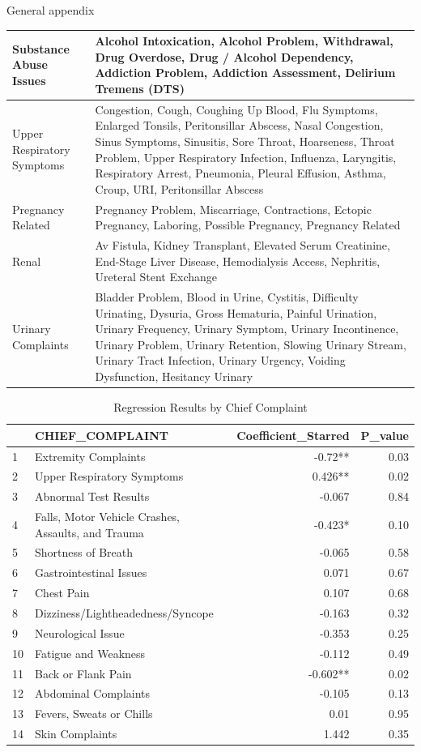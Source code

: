 \documentclass[,,nonblindrev]{informs}
\begin{document}
\begin{APPENDIX}{General appendix}
\begin{longtable}{|p{5cm}|p{12cm}|}
\hline
Substance Abuse Issues & Alcohol Intoxication, Alcohol Problem, Withdrawal, Drug Overdose, Drug / Alcohol Dependency, Addiction Problem, Addiction Assessment, Delirium Tremens (DTS) \\
\hline
Upper Respiratory Symptoms & Congestion, Cough, Coughing Up Blood, Flu Symptoms, Enlarged Tonsils, Peritonsillar Abscess, Nasal Congestion, Sinus Symptoms, Sinusitis, Sore Throat, Hoarseness, Throat Problem, Upper Respiratory Infection, Influenza, Laryngitis, Respiratory Arrest, Pneumonia, Pleural Effusion, Asthma, Croup, URI, Peritonsillar Abscess \\
\hline
Pregnancy Related & Pregnancy Problem, Miscarriage, Contractions, Ectopic Pregnancy, Laboring, Possible Pregnancy, Pregnancy Related \\
\hline
Renal & Av Fistula, Kidney Transplant, Elevated Serum Creatinine, End-Stage Liver Disease, Hemodialysis Access, Nephritis, Ureteral Stent Exchange \\
\hline
Urinary Complaints & Bladder Problem, Blood in Urine, Cystitis, Difficulty Urinating, Dysuria, Gross Hematuria, Painful Urination, Urinary Frequency, Urinary Symptom, Urinary Incontinence, Urinary Problem, Urinary Retention, Slowing Urinary Stream, Urinary Tract Infection, Urinary Urgency, Voiding Dysfunction, Hesitancy Urinary \\
\hline
\end{longtable}

\begin{table}[ht]
\centering
\caption{Regression Results by Chief Complaint} 
\begin{tabular}{llrr}
  \hline
 & CHIEF\_COMPLAINT & Coefficient\_Starred & P\_value \\ 
  \hline
1 & Extremity Complaints & -0.72** & 0.03 \\ 
  2 & Upper Respiratory Symptoms & 0.426** & 0.02 \\ 
  3 & Abnormal Test Results & -0.067 & 0.84 \\ 
  4 & Falls, Motor Vehicle Crashes, Assaults, and Trauma & -0.423* & 0.10 \\ 
  5 & Shortness of Breath & -0.065 & 0.58 \\ 
  6 & Gastrointestinal Issues & 0.071 & 0.67 \\ 
  7 & Chest Pain & 0.107 & 0.68 \\ 
  8 & Dizziness/Lightheadedness/Syncope & -0.163 & 0.32 \\ 
  9 & Neurological Issue & -0.353 & 0.25 \\ 
  10 & Fatigue and Weakness & -0.112 & 0.49 \\ 
  11 & Back or Flank Pain & -0.602** & 0.02 \\ 
  12 & Abdominal Complaints & -0.105 & 0.13 \\ 
  13 & Fevers, Sweats or Chills & 0.01 & 0.95 \\ 
  14 & Skin Complaints & 1.442 & 0.35 \\ 
   \hline
\end{tabular}
\end{table}


\end{APPENDIX}
\end{document}
